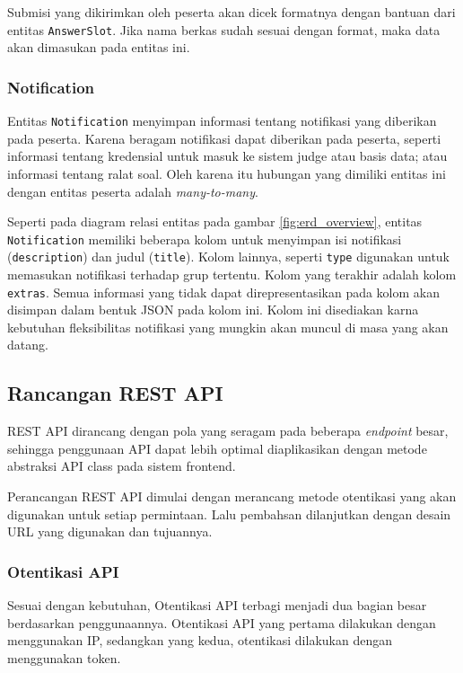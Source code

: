     Submisi yang dikirimkan oleh peserta akan dicek formatnya dengan bantuan
    dari entitas \texttt{AnswerSlot}. Jika nama berkas sudah sesuai dengan
    format, maka data akan dimasukan pada entitas ini.
    
\subsubsection{Notification}
    Entitas \texttt{Notification} menyimpan informasi tentang notifikasi yang
    diberikan pada peserta. Karena beragam notifikasi dapat diberikan pada
    peserta, seperti informasi tentang kredensial untuk masuk ke sistem judge
    atau basis data; atau informasi tentang ralat soal. Oleh karena itu hubungan
    yang dimiliki entitas ini dengan entitas peserta adalah
    \textit{many-to-many}.
    
    Seperti pada diagram relasi entitas pada gambar \ref{fig:erd_overview},
    entitas \texttt{Notification} memiliki beberapa kolom untuk menyimpan isi
    notifikasi (\texttt{description}) dan judul (\texttt{title}). Kolom lainnya,
    seperti \texttt{type} digunakan untuk memasukan notifikasi terhadap grup
    tertentu. Kolom yang terakhir adalah kolom \texttt{extras}. Semua informasi
    yang tidak dapat direpresentasikan pada kolom akan disimpan dalam bentuk
    JSON pada kolom ini. Kolom ini disediakan karna kebutuhan fleksibilitas
    notifikasi yang mungkin akan muncul di masa yang akan datang.

\subsection{Rancangan REST API}
    REST API dirancang dengan pola yang seragam pada beberapa \textit{endpoint}
    besar, sehingga penggunaan API dapat lebih optimal diaplikasikan dengan
    metode abstraksi API class pada sistem frontend.
    
    Perancangan REST API dimulai dengan merancang metode otentikasi yang akan
    digunakan untuk setiap permintaan. Lalu pembahsan dilanjutkan dengan desain
    URL yang digunakan dan tujuannya.
    
\subsubsection{Otentikasi API}
    Sesuai dengan kebutuhan, Otentikasi API terbagi menjadi dua bagian besar
    berdasarkan penggunaannya. Otentikasi API yang pertama dilakukan dengan
    menggunakan IP, sedangkan yang kedua, otentikasi dilakukan dengan
    menggunakan token.
    
